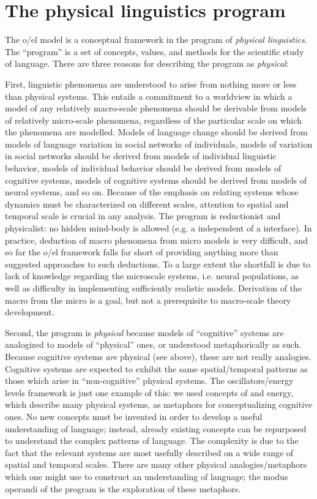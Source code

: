 \chapter{The physical linguistics program}

The o/el model is a conceptual framework in the program of \textit{physical linguistics}. The  “program” is a set of concepts, values, and methods for the scientific study of language. There are three reasons for describing the program as \textit{physical}: 

  First, linguistic phenomena are understood to arise from nothing more or less than physical systems. This entails a commitment to a worldview in which a model of any relatively macro-scale phenomena should be derivable from models of relatively micro-scale phenomena, regardless of the particular scale on which the phenomena are modelled. Models of language change should be derived from models of language variation in social networks of individuals, models of variation in social networks should be derived from models of individual linguistic behavior, models of individual behavior should be derived from models of cognitive systems, models of cognitive systems should be derived from models of neural systems, and so on. Because of the emphasis on relating systems whose dynamics must be characterized on different scales, attention to spatial and temporal scale is crucial in any analysis. The program is reductionist and physicalist: no hidden mind-body  is allowed (e.g. a  independent of a  interface). In practice, deduction of macro phenomena from micro models is very difficult, and so far the o/el framework falls far short of providing anything more than suggested approaches to such deductions. To a large extent the shortfall is due to lack of knowledge regarding the microscale systems, i.e. neural populations, as well as difficulty in implementing sufficiently realistic models. Derivation of the macro from the micro is a goal, but not a prerequisite to macro-scale theory development.

  Second, the program is \textit{physical} because models of “cognitive” systems are analogized to models of “physical” ones, or understood metaphorically as such. Because cognitive systems \textit{are} physical (see above), these are not really analogies. Cognitive systems are expected to exhibit the same spatial/temporal patterns as those which arise in “non-cognitive” physical systems. The oscillators/energy levels framework is just one example of this: we used concepts of  and energy, which describe many physical systems, as metaphors for conceptualizing cognitive ones. No new concepts must be invented in order to develop a useful understanding of language; instead, already existing concepts can be repurposed to understand the complex patterns of language. The complexity is due to the fact that the relevant systems are most usefully described on a wide range of spatial and temporal scales. There are many other physical analogies/metaphors which one might use to construct an understanding of language; the modus operandi of the program is the exploration of these metaphors.

